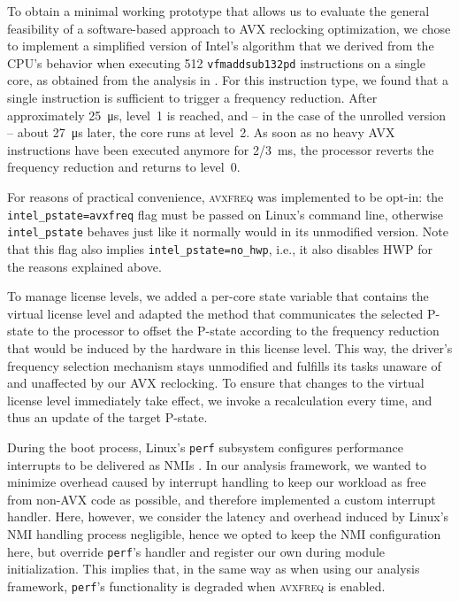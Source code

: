 To obtain a minimal working prototype that allows us to evaluate the general feasibility of a software-based approach to \gls{AVX} reclocking optimization, we chose to implement a simplified version of Intel's algorithm that we derived from the \gls{CPU}'s behavior when executing \SI[number-unit-product=-]{512}{\bit} \texttt{vfmaddsub132pd} instructions on a single core, as obtained from the analysis in . For this instruction type, we found that a single instruction is sufficient to trigger a frequency reduction. After approximately \SI{25}{\micro\second}, level~1 is reached, and -- in the case of the unrolled version -- about \SI{27}{\micro\second} later, the core runs at level~2. As soon as no heavy \gls{AVX} instructions have been executed anymore for \SI[quotient-mode=fraction]{2/3}{\milli\second}, the processor reverts the frequency reduction and returns to level~0. %

For reasons of practical convenience, \textsc{avxfreq} was implemented to be opt-in: the \texttt{intel\_pstate=avxfreq} flag must be passed on \gls{Linux}'s command line, otherwise \texttt{intel\_pstate} behaves just like it normally would in its unmodified version. Note that this flag also implies \texttt{intel\_pstate=no\_hwp}, i.e., it also disables \gls{HWP} for the reasons explained above.

To manage license levels, we added a per-core state variable that contains the virtual license level and adapted the method that communicates the selected \gls{P-state} to the processor to offset the \gls{P-state} according to the frequency reduction that would be induced by the hardware in this license level. This way, the driver's frequency selection mechanism stays unmodified and fulfills its tasks unaware of and unaffected by our \gls{AVX} reclocking. To ensure that changes to the virtual license level immediately take effect, we invoke a recalculation every time, and thus an update of the target \gls{P-state}.

During the boot process, \gls{Linux}'s \texttt{perf} subsystem configures performance interrupts to be delivered as \glspl{NMI} \cite{kernelx86eventscore}. In our analysis framework, we wanted to minimize overhead caused by interrupt handling to keep our workload as free from non-\gls{AVX} code as possible, and therefore implemented a custom interrupt handler. Here, however, we consider the latency and overhead induced by Linux's \gls{NMI} handling process negligible, hence we opted to keep the \gls{NMI} configuration here, but override \texttt{perf}'s handler and register our own during module initialization. This implies that, in the same way as when using our analysis framework, \texttt{perf}'s functionality is degraded when \textsc{avxfreq} is enabled.

